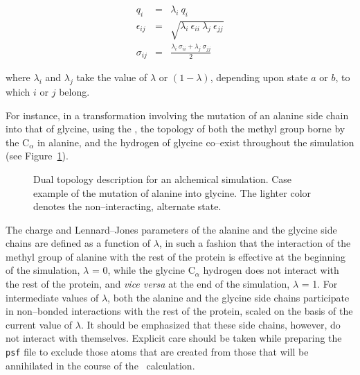 \begin{eqnarray}
\nonumber
q_i &=& \lambda_i \ q_i \\[0.4cm]
\epsilon_{ij} &=& \sqrt{\lambda_i \ \epsilon_{ii} \ \lambda_j \ \epsilon_{jj}} \\[0.4cm]
\nonumber
\sigma_{ij} &=& \frac{\lambda_i \ \sigma_{ii} + \lambda_j \ \sigma_{jj}}{2} 
\end{eqnarray}

where $\lambda_i$ and $\lambda_j$ take the value of $\lambda$ or $(1-\lambda)$,
depending upon state $a$ or $b$, to which $i$ or $j$ belong.


For instance, in a transformation involving the mutation of an
alanine side chain into that of glycine, using the \FEP, the topology
of both the methyl group borne by the C$_\alpha$ in alanine,
and the hydrogen of glycine co--exist throughout the simulation
(see Figure~\ref{fig:dual_top}).


\begin{figure}[ht]
  \caption{Dual topology description for an alchemical simulation.
         Case example of the mutation of alanine into glycine.
         The lighter color denotes the non--interacting, alternate
         state.}
  \label{fig:dual_top}
\end{figure}


The charge and Lennard--Jones parameters of the alanine and
the glycine side chains
are defined as a function of $\lambda$, in such a fashion that 
the interaction of the methyl group of alanine with the rest of 
the protein is effective at the beginning of the simulation,
\ie $\lambda$ = 0, while
the glycine C$_\alpha$ hydrogen does not interact with the rest
of the protein, and {\it vice versa} at the end of the
simulation, \ie $\lambda$ = 1.
For intermediate values of $\lambda$, both the alanine and the glycine
side chains participate in non--bonded interactions with the rest 
of the protein, scaled on the basis of the current value of $\lambda$.
It should be emphasized that these side chains, however,
do not interact with themselves. Explicit care should be taken while
preparing the {\tt psf} file to exclude those atoms that are created
from those that will be annihilated in the course of the
\FEP\ calculation.


